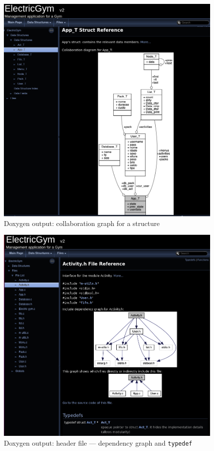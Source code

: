 %
\begin{figure}[htb!]
\centering
    \includegraphics[width=0.8\columnwidth]{./img/doxygen-out3.png}
  \caption{Doxygen output: collaboration graph for a structure}%
\label{fig:doxygen-out3}
\end{figure}
%
\begin{figure}[htb!]
\centering
    \includegraphics[width=0.8\columnwidth]{./img/doxygen-out4.png}
  \caption{Doxygen output: header file --- dependency graph and \texttt{typedef}}%
\label{fig:doxygen-out4}
\end{figure}
%
